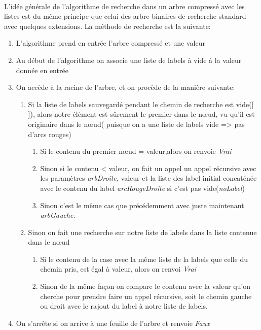 \paragraph{}
L'idée générale de l'algorithme de recherche dans un arbre compressé avec les listes est du même principe que celui des arbre binaires de recherche standard avec quelques extensions. 
La méthode de recherche est la suivante:
\begin{enumerate}
    \item L'algorithme prend en entrée l'arbre compressé et une valeur
    \item Au début de l'algorithme on associe une liste de labels à vide à la valeur donnée en entrée
    \item On accède à la racine de l'arbre, et on procède de la manière suivante:
    \begin{enumerate}
        \item Si la liste de labels sauvegardé pendant le chemin de recherche est vide([ ]), alors notre élément est sûrement le premier dans le nœud, vu qu'il est originaire dans le nœud( puisque on a une liste de labels vide => pas d'arcs rouges)
        \begin{enumerate}
            \item Si le contenu du premier nœud = valeur,alors on renvoie \textit{Vrai}
            \item Sinon si le contenu < valeur, on fait un appel un appel récursive avec les paramètres \textit{arbDroite}, valeur et la liste des label initial concaténée avec le contenu du label \textit{arcRougeDroite} si c'est pas vide(\textit{noLabel})
            \item Sinon c'est le même cas que précédemment avec juste maintenant \textit{arbGauche}.
        \end{enumerate}
        \item Sinon on fait une recherche sur notre liste de labels dans la liste contenue dans le nœud
        \begin{enumerate}
            \item Si le contenu de la case avec la même liste de la labels que celle du chemin pris, est égal à valeur, alors on renvoi \textit{Vrai}
            \item Sinon de la même façon on compare le contenu avec la valeur qu'on cherche pour prendre faire un appel récursive, soit le chemin gauche ou droit avec le rajout du label à notre liste de labels.
        \end{enumerate}
    \end{enumerate}
    \item On s'arrête si on arrive à une feuille de l'arbre et renvoie \textit{Faux} 
\end{enumerate}
